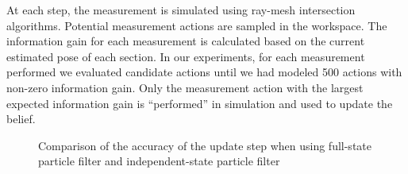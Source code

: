 \documentclass[letterpaper, 10 pt, conference]{ieeeconf}
\begin{document}
At each step, the measurement is simulated using ray-mesh intersection algorithms\cite{Saund2017}. 
Potential measurement actions are sampled in the workspace. 
The information gain for each measurement is calculated based on the current estimated pose of each section. In our experiments, for each measurement performed we evaluated candidate actions until we had modeled 500 actions with non-zero information gain. Only the measurement action with the largest expected information gain is ``performed'' in simulation and used to update the belief. 
\begin{figure}
\centering
{}


\caption{Comparison of the accuracy of the update step when using full-state particle filter and independent-state particle filter}
\label{fig:Simulation}
\end{figure}
\end{document}

